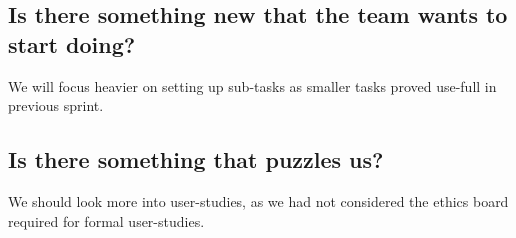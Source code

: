 \subsection*{Is there something new that the team wants to start doing?}
We will focus heavier on setting up sub-tasks as smaller tasks proved use-full in previous sprint.

\subsection*{ Is there something that puzzles us?}
We should look more into user-studies, as we had not considered the ethics board required for formal user-studies.

\newpage
